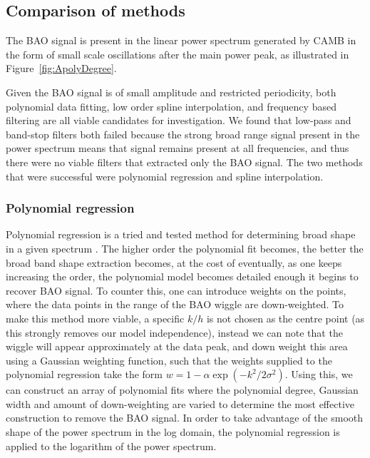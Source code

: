 \documentclass[a4paper,fleqn,usenatbib]{mnras}
\begin{document}
	\subsection{Comparison of methods}
	
	The BAO signal is present in the linear power spectrum generated by CAMB in the form of small scale oscillations after the main power peak, as illustrated in Figure~\ref{fig:ApolyDegree}. %
	
	Given the BAO signal is of small amplitude and restricted periodicity, both polynomial data fitting, low order spline interpolation, and frequency based filtering are all viable candidates for investigation.
	We found that low-pass and band-stop filters both failed because the strong broad range signal present in the power spectrum means that signal remains present at all frequencies, and thus there were no viable filters that extracted only the BAO signal.  The two methods that were successful were polynomial regression and spline interpolation.  
	
	\subsubsection{Polynomial regression}
	
	Polynomial regression is a tried and tested method for determining broad shape in a given spectrum \citep{baldry2014galaxy}. The higher order the polynomial fit becomes, the better the broad band shape extraction becomes, at the cost of eventually, as one keeps increasing the order, the polynomial model becomes detailed enough it begins to recover BAO signal. To counter this, one can introduce weights on the points, where the data points in the range of the BAO wiggle are down-weighted. To make this method more viable, a specific $k/h$ is not chosen as the centre point (as this strongly removes our model independence), instead we can note that the wiggle will appear approximately at the data peak, and down weight this area using a Gaussian weighting function, such that the weights supplied to the polynomial regression take the form $w = 1 - \alpha \exp\left(-k^2/2 \sigma^2\right)$. Using this, we can construct an array of polynomial fits where the polynomial degree, Gaussian width and amount of down-weighting are varied to determine the most effective construction to remove the BAO signal. In order to take advantage of the smooth shape of the power spectrum in the log domain, the polynomial regression is applied to the logarithm of the power spectrum.
	
\end{document}
